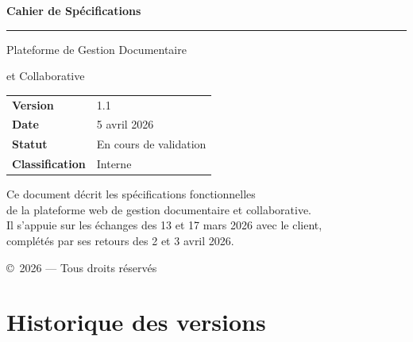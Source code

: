 \documentclass[a4paper,12pt,french]{article}
\begin{document}
\begin{titlepage}
\begin{center}

\vspace*{2cm}

{\LARGE\bfseries\textcolor{darkbg}{Cahier de Spécifications}}

\vspace{0.5cm}

{\Large\textcolor{accentgreen}{\rule{4cm}{2pt}}}

\vspace{1cm}

{\Large\textcolor{maintext}{Plateforme de Gestion Documentaire}}

{\Large\textcolor{maintext}{et Collaborative}}

\vspace{2cm}

\begin{tabular}{ll}
\textbf{Version}        & 1.1 \\
\textbf{Date}           & 5 avril 2026 \\
\textbf{Statut}         & En cours de validation \\
\textbf{Classification} & Interne \\
\end{tabular}

\vspace{2cm}

{\small\textcolor{maintext}{
Ce document décrit les spécifications fonctionnelles\\
de la plateforme web de gestion documentaire et collaborative.\\[0.5em]
Il s'appuie sur les échanges des 13 et 17 mars 2026 avec le client,\\
complétés par ses retours des 2 et 3 avril 2026.
}}

\vfill

{\footnotesize\textcolor{maintext}{\copyright\ 2026 — Tous droits réservés}}

\end{center}
\end{titlepage}

\newpage
\section*{Historique des versions}
\end{document}
